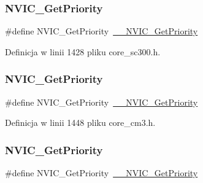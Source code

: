 \subsubsection{\texorpdfstring{N\+V\+I\+C\+\_\+\+Get\+Priority}{NVIC\_GetPriority}\hspace{0.1cm}{\footnotesize\ttfamily [7/12]}}
{\footnotesize\ttfamily \#define N\+V\+I\+C\+\_\+\+Get\+Priority~\hyperlink{group___c_m_s_i_s___core___n_v_i_c_functions_gaeb9dc99c8e7700668813144261b0bc73}{\+\_\+\+\_\+\+N\+V\+I\+C\+\_\+\+Get\+Priority}}



Definicja w linii 1428 pliku core\+\_\+sc300.\+h.

\mbox{\label{group___c_m_s_i_s___core___n_v_i_c_functions_gaf59b9d0a791d2157abb319753953eceb}} 
\subsubsection{\texorpdfstring{N\+V\+I\+C\+\_\+\+Get\+Priority}{NVIC\_GetPriority}\hspace{0.1cm}{\footnotesize\ttfamily [8/12]}}
{\footnotesize\ttfamily \#define N\+V\+I\+C\+\_\+\+Get\+Priority~\hyperlink{group___c_m_s_i_s___core___n_v_i_c_functions_gaeb9dc99c8e7700668813144261b0bc73}{\+\_\+\+\_\+\+N\+V\+I\+C\+\_\+\+Get\+Priority}}



Definicja w linii 1448 pliku core\+\_\+cm3.\+h.

\mbox{\label{group___c_m_s_i_s___core___n_v_i_c_functions_gaf59b9d0a791d2157abb319753953eceb}} 
\subsubsection{\texorpdfstring{N\+V\+I\+C\+\_\+\+Get\+Priority}{NVIC\_GetPriority}\hspace{0.1cm}{\footnotesize\ttfamily [9/12]}}
{\footnotesize\ttfamily \#define N\+V\+I\+C\+\_\+\+Get\+Priority~\hyperlink{group___c_m_s_i_s___core___n_v_i_c_functions_gaeb9dc99c8e7700668813144261b0bc73}{\+\_\+\+\_\+\+N\+V\+I\+C\+\_\+\+Get\+Priority}}



